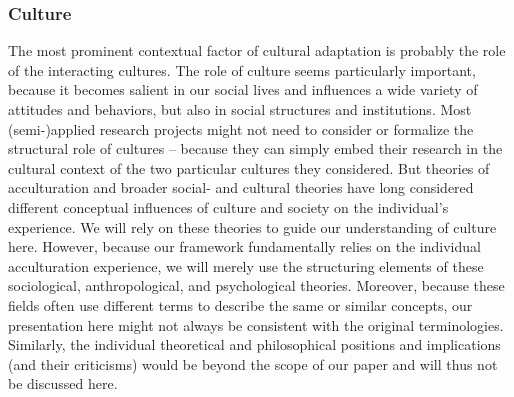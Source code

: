 \documentclass[man, 12pt, a4paper]{apa7}
\begin{document}
\subsubsection{Culture} 
The most prominent contextual factor of cultural adaptation is probably the role of the interacting cultures. The role of culture seems particularly important, because it becomes salient in our social lives and influences a wide variety of attitudes and behaviors, but also in social structures and institutions. 
Most (semi-)applied research projects might not need to consider or formalize the structural role of cultures -- because they can simply embed their research in the cultural context of the two particular cultures they considered.
But theories of acculturation and broader social- and cultural theories have long considered different conceptual influences of culture and society on the individual's experience. We will rely on these theories to guide our understanding of culture here. However, because our framework fundamentally relies on the individual acculturation experience, we will merely use the structuring elements of these sociological, anthropological, and psychological theories. Moreover, because these fields often use different terms to describe the same or similar concepts, our presentation here might not always be consistent with the original terminologies. Similarly, the individual theoretical and philosophical positions and implications (and their criticisms) would be beyond the scope of our paper and will thus not be discussed here.
\end{document}
